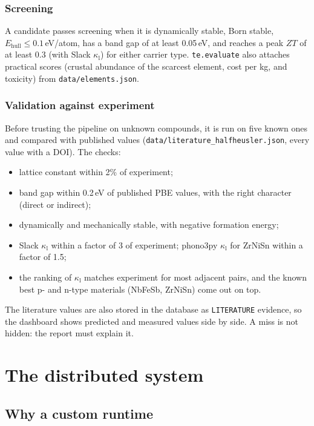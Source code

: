 \documentclass[11pt,a4paper]{report}
\newcommand{\code}[1]{\texttt{#1}}
\newcommand{\kl}{\kappa_\mathrm{l}}
\begin{document}
\section{Screening}

A candidate passes screening when it is dynamically stable, Born stable,
$E_\mathrm{hull}\le0.1$\,eV/atom, has a band gap of at least 0.05\,eV, and reaches a peak $ZT$ of
at least 0.3 (with Slack $\kl$) for either carrier type. \code{te.evaluate} also attaches
practical scores (crustal abundance of the scarcest element, cost per kg, and toxicity) from
\code{data/elements.json}.

\section{Validation against experiment}

Before trusting the pipeline on unknown compounds, it is run on five known ones and compared with
published values (\code{data/literature\_halfheusler.json}, every value with a DOI). The checks:
\begin{itemize}
\item lattice constant within 2\% of experiment;
\item band gap within 0.2\,eV of published PBE values, with the right character (direct or indirect);
\item dynamically and mechanically stable, with negative formation energy;
\item Slack $\kl$ within a factor of 3 of experiment; phono3py $\kl$ for ZrNiSn within a factor of 1.5;
\item the ranking of $\kl$ matches experiment for most adjacent pairs, and the known best p- and
  n-type materials (NbFeSb, ZrNiSn) come out on top.
\end{itemize}
The literature values are also stored in the database as \code{LITERATURE} evidence, so the
dashboard shows predicted and measured values side by side. A miss is not hidden: the report
must explain it.

\part{The distributed system}

\chapter{Why a custom runtime}
\end{document}

